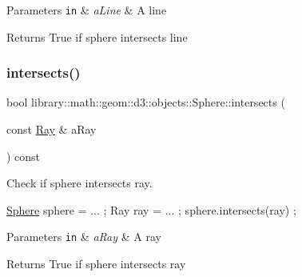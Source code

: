 \begin{DoxyParams}[1]{Parameters}
\mbox{\tt in}  & {\em a\+Line} & A line \\
\hline
\end{DoxyParams}
\begin{DoxyReturn}{Returns}
True if sphere intersects line 
\end{DoxyReturn}
\mbox{\label{classlibrary_1_1math_1_1geom_1_1d3_1_1objects_1_1_sphere_a726c504380238289eb3a2faf80f3d472}} 
\subsubsection{\texorpdfstring{intersects()}{intersects()}\hspace{0.1cm}{\footnotesize\ttfamily [4/9]}}
{\footnotesize\ttfamily bool library\+::math\+::geom\+::d3\+::objects\+::\+Sphere\+::intersects (\begin{DoxyParamCaption}\item[{const \hyperlink{classlibrary_1_1math_1_1geom_1_1d3_1_1objects_1_1_ray}{Ray} \&}]{a\+Ray }\end{DoxyParamCaption}) const}



Check if sphere intersects ray. 


\begin{DoxyCode}
\hyperlink{classlibrary_1_1math_1_1geom_1_1d3_1_1objects_1_1_sphere_a55dccc8ea16ee55cd7694c26afa8ea39}{Sphere} sphere = ... ;
Ray ray = ... ;
sphere.intersects(ray) ;
\end{DoxyCode}



\begin{DoxyParams}[1]{Parameters}
\mbox{\tt in}  & {\em a\+Ray} & A ray \\
\hline
\end{DoxyParams}
\begin{DoxyReturn}{Returns}
True if sphere intersects ray 
\end{DoxyReturn}
\mbox{\label{classlibrary_1_1math_1_1geom_1_1d3_1_1objects_1_1_sphere_af2ec8951ba63bd6718588e491213fddf}} 
